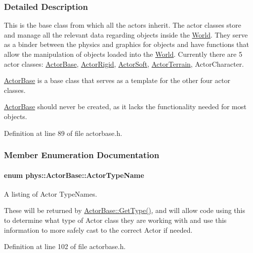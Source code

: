 \subsubsection{Detailed Description}
This is the base class from which all the actors inherit. The actor classes store and manage all the relevant data regarding objects inside the \hyperlink{classphys_1_1World}{World}. They serve as a binder between the physics and graphics for objects and have functions that allow the manipulation of objects loaded into the \hyperlink{classphys_1_1World}{World}. Currently there are 5 actor classes: \hyperlink{classphys_1_1ActorBase}{ActorBase}, \hyperlink{classphys_1_1ActorRigid}{ActorRigid}, \hyperlink{classphys_1_1ActorSoft}{ActorSoft}, \hyperlink{classphys_1_1ActorTerrain}{ActorTerrain}, ActorCharacter. \par
 \hyperlink{classphys_1_1ActorBase}{ActorBase} is a base class that serves as a template for the other four actor classes. \par
 \hyperlink{classphys_1_1ActorBase}{ActorBase} should never be created, as it lacks the functionality needed for most objects. 

Definition at line 89 of file actorbase.h.



\subsubsection{Member Enumeration Documentation}
\hypertarget{classphys_1_1ActorBase_aff3a7c464e8ce82576073f8f891434b7}{
\paragraph[{ActorTypeName}]{\setlength{\rightskip}{0pt plus 5cm}enum {\bf phys::ActorBase::ActorTypeName}}\hfill}
\label{classphys_1_1ActorBase_aff3a7c464e8ce82576073f8f891434b7}


A listing of Actor TypeNames. 

These will be returned by \hyperlink{classphys_1_1ActorBase_ac631b0572fbcac6ac6dee3b0a8704c8e}{ActorBase::GetType()}, and will allow code using this to determine what type of Actor class they are working with and use this information to more safely cast to the correct Actor if needed. 

Definition at line 102 of file actorbase.h.



